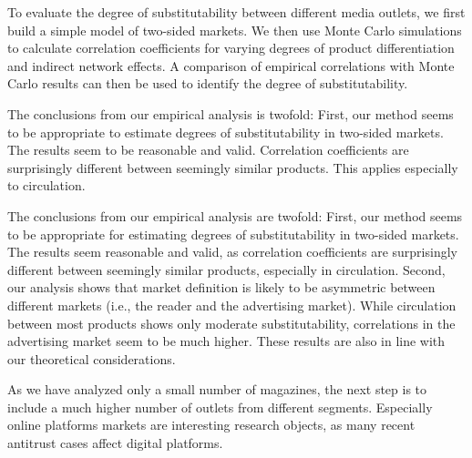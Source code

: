 \documentclass[12pt,a4paper,notitlepage]{article}
\begin{document}
To evaluate the degree of substitutability between different media outlets, we first build a simple model of two-sided markets. We then use Monte Carlo simulations to calculate correlation coefficients for varying degrees of product differentiation and indirect network effects. A comparison of empirical correlations with Monte Carlo results can then be used to identify the degree of substitutability. 

The conclusions from our empirical analysis is twofold: First, our method seems to be appropriate to estimate degrees of substitutability in two-sided markets. The results seem to be reasonable and valid. Correlation coefficients are surprisingly different between seemingly similar products. This applies especially to circulation. 

The conclusions from our empirical analysis are twofold: First, our method seems to be appropriate for estimating degrees of substitutability in two-sided markets. The results seem reasonable and valid, as correlation coefficients are surprisingly different between seemingly similar products,  especially in circulation. Second, our analysis shows that market definition is likely to be asymmetric between different markets (i.e., the reader and the advertising market). While circulation between most products shows only moderate substitutability, correlations in the advertising market seem to be much higher. These results are also in line with our theoretical considerations. 

As we have analyzed only a small number of magazines, the next step is to include a much higher number of outlets from different segments. Especially online platforms markets are interesting research objects, as many recent antitrust cases affect digital platforms. \pagebreak


\printbibliography \pagebreak
\end{document}

